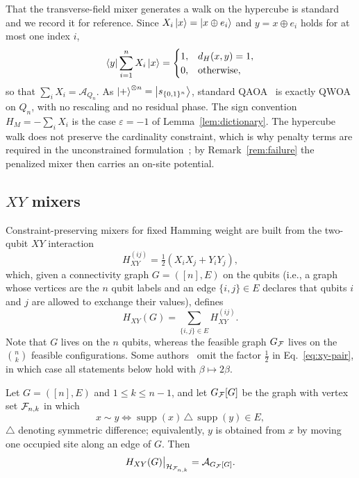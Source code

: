 That the transverse-field mixer generates a walk on the hypercube is standard~\cite{Marsh2019,Marsh2020,Slate2021,Matwiejew2024} and we record it for reference. Since $X_i\ket{x}=\ket{x\oplus e_i}$ and $y=x\oplus e_i$ holds for at most one index $i$,
\begin{equation}
\bra{y}\sum_{i=1}^{n}X_i\ket{x} =
    \begin{cases}
        1, & d_H(x,y)=1,\\
0, & \text{otherwise},
    \end{cases}
    \label{eq:hypercube}
\end{equation}
so that $\sum_i X_i=\mathcal{A}_{Q_n}$. As $\ket{+}^{\otimes n}=\ket{s_{\{0,1\}^n}}$, standard QAOA~\cite{Farhi2014} is exactly QWOA on $Q_n$, with no rescaling and no residual phase. The sign convention $H_M=-\sum_i X_i$ is the case $\varepsilon=-1$ of Lemma~\ref{lem:dictionary}. The hypercube walk does not preserve the cardinality constraint, which is why penalty terms are required in the unconstrained formulation~\cite{Lucas2014,Hodson2019}; by Remark~\ref{rem:failure} the penalized mixer then carries an on-site potential.

\subsection{\label{subsec:xy}$XY$ mixers}

Constraint-preserving mixers for fixed Hamming weight are built from the two-qubit $XY$ interaction~\cite{Wang2020}
\begin{equation}
H^{(ij)}_{XY} = \tfrac{1}{2}\left(X_iX_j+Y_iY_j\right),
    \label{eq:xy-pair}
\end{equation}
which, given a connectivity graph $G=([n],E)$ on the qubits (i.e., a graph whose vertices are the $n$ qubit labels and an edge $\{i,j\}\in E$ declares that qubits $i$ and $j$ are allowed to exchange their values), defines
\begin{equation}
H_{XY}(G) = \sum_{\{i,j\}\in E} H^{(ij)}_{XY} .
    \label{eq:xy-mixer}
\end{equation}
Note that $G$ lives on the $n$ qubits, whereas the feasible graph $G_{\mathcal{F}}$ lives on the $\binom{n}{k}$ feasible configurations. Some authors~\cite{Wang2020,Matwiejew2024} omit the factor $\tfrac12$ in Eq.~\eqref{eq:xy-pair}, in which case all statements below hold with $\beta\mapsto2\beta$.

\begin{proposition}
\label{prop:xy-hopping}
Let $G=([n],E)$ and $1\le k\le n-1$, and let $G_{\mathcal{F}}[G]$ be the graph with vertex set $\mathcal{F}_{n,k}$ in which
\begin{equation}
x\sim y \iff \operatorname{supp}(x)\,\triangle\,\operatorname{supp}(y)\in E ,
    \label{eq:induced-adjacency}
\end{equation}
$\triangle$ denoting symmetric difference; equivalently, $y$ is obtained from $x$ by moving one occupied site along an edge of $G$. Then
\begin{equation}
H_{XY}(G)\big|_{\mathcal{H}_{\mathcal{F}_{n,k}}} = \mathcal{A}_{G_{\mathcal{F}}[G]} .
    \label{eq:xy-hopping}
\end{equation}
\end{proposition}

